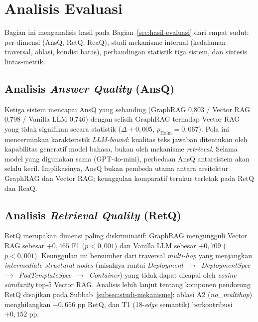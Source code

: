 \section{Analisis Evaluasi}
\label{sec:analisis-evaluasi}

Bagian ini menganalisis hasil pada Bagian~\ref{sec:hasil-evaluasi} dari empat sudut: per-dimensi (AnsQ, RetQ, ReaQ), studi mekanisme internal (kedalaman traversal, ablasi, kondisi batas), perbandingan statistik tiga sistem, dan sintesis lintas-metrik.

\subsection{Analisis \textit{Answer Quality} (AnsQ)}
\label{subsec:analisis-ansq}

Ketiga sistem mencapai AnsQ yang sebanding (GraphRAG 0,803 / Vector RAG 0,798 / Vanilla LLM 0,746) dengan selisih GraphRAG terhadap Vector RAG yang tidak signifikan secara statistik ($\Delta{+}0{,}005$, $p_{\text{Holm}}{=}0{,}067$). Pola ini mencerminkan karakteristik \textit{LLM-bound}: kualitas teks jawaban ditentukan oleh kapabilitas generatif model bahasa, bukan oleh mekanisme \textit{retrieval}. Selama model yang digunakan sama (GPT-4o-mini), perbedaan AnsQ antarsistem akan selalu kecil. Implikasinya, AnsQ bukan pembeda utama antara arsitektur GraphRAG dan Vector RAG; keunggulan komparatif terukur terletak pada RetQ dan ReaQ.

\subsection{Analisis \textit{Retrieval Quality} (RetQ)}
\label{subsec:analisis-retq}

RetQ merupakan dimensi paling diskriminatif: GraphRAG mengungguli Vector RAG sebesar $+0{,}465$ F1 ($p{<}0{,}001$) dan Vanilla LLM sebesar $+0{,}709$ ($p{<}0{,}001$). Keunggulan ini bersumber dari traversal \textit{multi-hop} yang menjangkau \textit{intermediate structural nodes} (misalnya rantai \textit{Deployment}~$\to$~\textit{DeploymentSpec}~$\to$~\textit{PodTemplateSpec}~$\to$~\textit{Container}) yang tidak dapat dicapai oleh \textit{cosine similarity} top-5 Vector RAG. Analisis lebih lanjut tentang komponen pendorong RetQ disajikan pada Subbab~\ref{subsec:studi-mekanisme}: ablasi A2 (\textit{no\_multihop}) menghilangkan $-0{,}656$ pp RetQ, dan T1 (18-\textit{edge} semantik) berkontribusi $+0{,}152$ pp.

